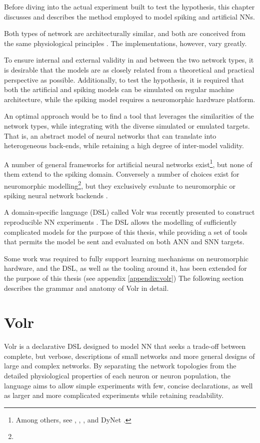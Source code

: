 \documentclass{report.tex}{subfiles}
\begin{document}
Before diving into the actual experiment built to test the hypothesis, this
chapter discusses and describes the method employed to model spiking
and artificial \gls{NN}s.

Both types of network are architecturally similar, and both are conceived from
the same physiological principles \autocite{dayan2001, russel2007, Nilsson2009, schmidhuber2014}.
The implementations, however, vary greatly.

To ensure internal and external validity in and between the two network types,
it is desirable that the models are as closely related from a theoretical and
practical perspective as possible.
Additionally, to test the hypothesis, it is required that both the artificial
and spiking models can be simulated on regular machine architecture, while
the spiking model requires a neuromorphic hardware platform.

An optimal approach would be to find a tool that leverages the similarities
of the network types, while integrating with the diverse simulated or emulated
targets.
That is, an abstract model of neural networks that can translate into
heterogeneous back-ends, while retaining a high degree of inter-model validity.

A number of general frameworks for artificial neural networks
exist\footnote{
  Among others, see \autocite{ONNX2018}, \autocite{PyTorch2018}, \autocite{TensorFlow2018},
  \autocite{Keras2018} and DyNet \autocite{Neubig2017}.
}, but none of them extend to the spiking domain.
Conversely a number of choices exist for neuromorphic modelling\footnote{
}, but they exclusively evaluate to neuromorphic or spiking neural network
backends \autocite{Jordan2018}.

A domain-specific language (DSL) called Volr was recently presented to
construct reproducible \gls{NN} experiments
\autocite{Pedersen2018:volr}.
The DSL allows the modelling of sufficiently complicated models for
the purpose of this thesis, while providing a set of tools that permits the
model be sent and evaluated on both \gls{ANN} and \gls{SNN} targets.

Some work was required to fully support learning mechanisms on
neuromorphic hardware, and the DSL, as well as the tooling around it, has been
extended for the purpose of this thesis (see appendix \ref{appendix:volr})
The following section describes the grammar and anatomy of Volr in detail.

\section{Volr}
Volr is a declarative DSL designed to model \gls{NN} that seeks a
trade-off between complete, but verbose, descriptions of small
networks and more general designs of large and complex networks.
By separating the network topologies from the detailed physiological properties
of each neuron or neuron population, the language aims to allow simple
experiments with few, concise declarations, as well as larger and more
complicated experiments while retaining readability.
\end{document}
